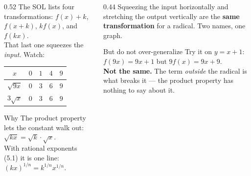 \documentclass[aspectratio=169, 11pt]{beamer}
\begin{document}
\begin{frame}[t, plain]
  \begin{columns}[T]
    \begin{column}{0.52\textwidth}
      \footnotesize
      The SOL lists four transformations: $f(x)+k$, $f(x+k)$, $kf(x)$, and $f(kx)$. \\
      That last one squeezes the \emph{input}. Watch:
      \vspace{3pt}
      \begin{center}
      \renewcommand{\arraystretch}{1.25}
      \begin{tabular}{|c|c|c|c|c|}
      \hline
      $x$ & $0$ & $1$ & $4$ & $9$ \\ \hline
      $\sqrt{9x}$ & $0$ & $3$ & $6$ & $9$ \\ \hline
      $3\sqrt{x}$ & $0$ & $3$ & $6$ & $9$ \\ \hline
      \end{tabular}
      \end{center}
      \vspace{3pt}
      \begin{block}{Why}
        The product property lets the constant walk out: $\sqrt{kx}=\sqrt{k}\cdot\sqrt{x}$. \\[3pt]
        With rational exponents (5.1) it is one line: $(kx)^{1/n}=k^{1/n}x^{1/n}$.
      \end{block}
    \end{column}
    \begin{column}{0.44\textwidth}
      \footnotesize
      Squeezing the input horizontally and stretching the output vertically are the \textbf{same
      transformation} for a radical. Two names, one graph.
      \vspace{4pt}
      \begin{block}{But do not over-generalize}
        Try it on $y=x+1$: \\[3pt]
        $f(9x)=9x+1$ \quad but \quad $9f(x)=9x+9$. \\[3pt]
        \textbf{Not the same.} The term \emph{outside} the radical is what breaks it --- the product
        property has nothing to say about it.
      \end{block}
    \end{column}
  \end{columns}
\end{frame}
\end{document}
